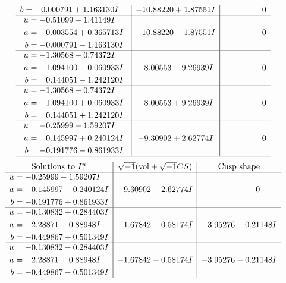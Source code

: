 \documentclass[1p]{elsarticle_modified}
\theoremstyle{definition}
\newcommand{\I}{\sqrt{-1}}
\begin{document}
$$\begin{array}{c|c|c}
\begin{aligned}
b &= -0.000791 + 1.163130 I\end{aligned}
 & -10.88220 + 1.87551 I & \phantom{-0.000000 } 0 \\ \hline\begin{aligned}
u &= -0.51099 - 1.41149 I \\
a &= \phantom{-}0.003554 + 0.365713 I \\
b &= -0.000791 - 1.163130 I\end{aligned}
 & -10.88220 - 1.87551 I & \phantom{-0.000000 } 0 \\ \hline\begin{aligned}
u &= -1.30568 + 0.74372 I \\
a &= \phantom{-}1.094100 - 0.060933 I \\
b &= \phantom{-}0.144051 - 1.242120 I\end{aligned}
 & -8.00553 - 9.26939 I & \phantom{-0.000000 } 0 \\ \hline\begin{aligned}
u &= -1.30568 - 0.74372 I \\
a &= \phantom{-}1.094100 + 0.060933 I \\
b &= \phantom{-}0.144051 + 1.242120 I\end{aligned}
 & -8.00553 + 9.26939 I & \phantom{-0.000000 } 0 \\ \hline\begin{aligned}
u &= -0.25999 + 1.59207 I \\
a &= \phantom{-}0.145997 + 0.240124 I \\
b &= -0.191776 - 0.861933 I\end{aligned}
 & -9.30902 + 2.62774 I & \phantom{-0.000000 } 0\\
 \hline 
 \end{array}$$\newpage$$\begin{array}{c|c|c}  
\text{Solutions to }I^u_{1}& \I (\text{vol} + \sqrt{-1}CS) & \text{Cusp shape}\\
 \hline 
\begin{aligned}
u &= -0.25999 - 1.59207 I \\
a &= \phantom{-}0.145997 - 0.240124 I \\
b &= -0.191776 + 0.861933 I\end{aligned}
 & -9.30902 - 2.62774 I & \phantom{-0.000000 } 0 \\ \hline\begin{aligned}
u &= -0.130832 + 0.284403 I \\
a &= -2.28871 - 0.88948 I \\
b &= -0.449867 + 0.501349 I\end{aligned}
 & -1.67842 + 0.58174 I & -3.95276 + 0.21148 I \\ \hline\begin{aligned}
u &= -0.130832 - 0.284403 I \\
a &= -2.28871 + 0.88948 I \\
b &= -0.449867 - 0.501349 I\end{aligned}
 & -1.67842 - 0.58174 I & -3.95276 - 0.21148 I\\
 \hline 
 \end{array}$$\newpage\newpage\renewcommand{\arraystretch}{1}
\end{document}
